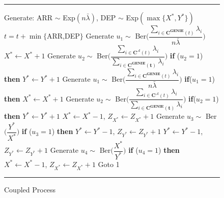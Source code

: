 \documentclass[10pt, conference, letterpaper]{IEEEtran}
\begin{document}
\begin{figure}[h]
	\hrule
	\vspace{0.1in}
	\begin{algorithmic}[1]
		\STATE Generate: ARR $\sim$ Exp$(n \bar{\lambda})$, DEP $\sim$ Exp$(\max\{X^*,Y^*\})$
		\STATE $t=t+\min\{$ARR,DEP$\}$
		\STATE Generate $u_1 \sim$ Ber$\bigg(\dfrac{\sum_{i \in \mathbf{C^{GENIE}}(t)} \lambda_i}{n \bar{\lambda}}\bigg)$
		\STATE $X^* \gets X^* + 1$
		\STATE Generate $u_2 \sim$ Ber$\bigg(\dfrac{\sum_{i \in \mathbf{C^{\mathcal{A}}}(t)} \lambda_i}{\sum_{i \in \mathbf{C^{GENIE}(t)}}\lambda_i}\bigg)$
		\STATE \textbf{if} ($u_2 =1$) \textbf{then} $Y^* \gets Y^* +1$
		\ENDIF
		\ELSE
		\STATE Generate $u_1 \sim$ Ber$\bigg(\dfrac{\sum_{i \in \mathbf{C^{GENIE}}(t)} \lambda_i}{n \bar{\lambda}}\bigg)$
		\STATE \textbf{if}($u_1 =1$) \textbf{then} $X^* \gets X^* + 1$
		\STATE Generate $u_2 \sim$ Ber$\bigg(\dfrac{\sum_{i \in \mathbf{C^{\mathcal{A}}}(t)} \lambda_i}{\sum_{i \in \mathbf{C^{GENIE}(t)}}\lambda_i}\bigg)$
		\STATE \textbf{if}($u_2 =1$) \textbf{then} $Y^* \gets Y^* + 1$
		\ENDIF
		\ELSE
		\STATE $X^* \gets X^* - 1$, $Z_{X^*} \gets Z_{X^*} + 1$
		\STATE Generate $u_3 \sim$ Ber$\bigg(\dfrac{Y^*}{X^*}\bigg)$
		\STATE \textbf{if} ($u_3 =1$) \textbf{then} $Y^* \gets Y^* - 1$, $Z_{Y^*} \gets Z_{Y^*} + 1$
		\ELSE
		\STATE $Y^* \gets Y^* - 1$, $Z_{Y^*} \gets Z_{Y^*} + 1$
		\STATE Generate $u_4 \sim$ Ber$\bigg(\dfrac{X^*}{Y^*}\bigg)$
		\STATE \textbf{if} ($u_4 =1$) \textbf{then} $X^* \gets X^* - 1$, $Z_{X^*} \gets Z_{X^*} + 1$
		\ENDIF
		\ENDIF
		\STATE Goto 1
	\end{algorithmic}
	\vspace{0.1in}
	\hrule
	\caption{Coupled Process}
	\label{fig:coupling}
\end{figure}
\end{document}
